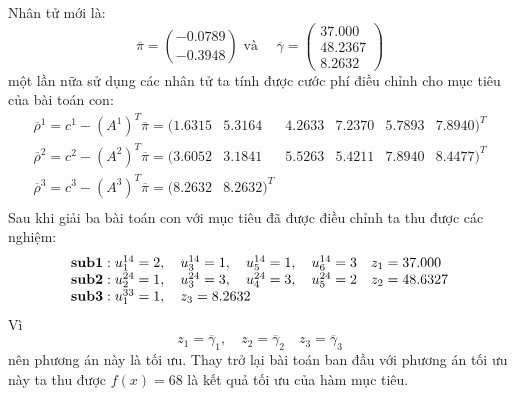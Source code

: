 Nhân tử mới là:
\begin{displaymath}\overline\pi=\binom{-0.0789}{-0.3948}\textrm{ và }\quad \overline\gamma=\left(\begin{matrix}37.000\\48.2367\\8.2632\end{matrix}\right)\end{displaymath}
một lần nữa sử dụng các nhân tử ta tính được cước phí điều chỉnh cho mục tiêu của bài toán con:
\begin{displaymath}
\begin{array}{llllll}
\overline\rho^1=c^1-(A^1)^T\overline\pi=(1.6315&5.3164&4.2633&7.2370&5.7893&7.8940)^T\\
\overline\rho^2=c^2-(A^2)^T\overline\pi=(3.6052&3.1841&5.5263&5.4211&7.8940&8.4477)^T\\
\overline\rho^3=c^3-(A^3)^T\overline\pi=(8.2632&8.2632)^T\\
\end{array}
\end{displaymath}
Sau khi giải ba bài toán con với mục tiêu đã được điều chỉnh ta thu được các nghiệm:
\begin{displaymath}
\begin{array}{llll}
{\bf sub1}: u_1^{14}=2,\quad u_3^{14}=1,\quad u_5^{14}=1,\quad u_6^{14}=3\quad z_1=37.000\\
{\bf sub2}: u_2^{24}=1,\quad u_3^{24}=3,\quad u_4^{24}=3,\quad u_5^{24}=2\quad z_2=48.6327\\
{\bf sub3}: u_1^{33}=1,\quad z_3=8.2632
\end{array}
\end{displaymath}
Vì \begin{displaymath}z_1=\overline\gamma_1,\quad z_2=\overline\gamma_2\quad z_3=\overline\gamma_3\end{displaymath}
nên phương án này là tối ưu. Thay trở lại bài toán ban đầu với phương án tối ưu này ta thu được $f(x)=68$ là kết quả tối ưu của hàm mục tiêu.

